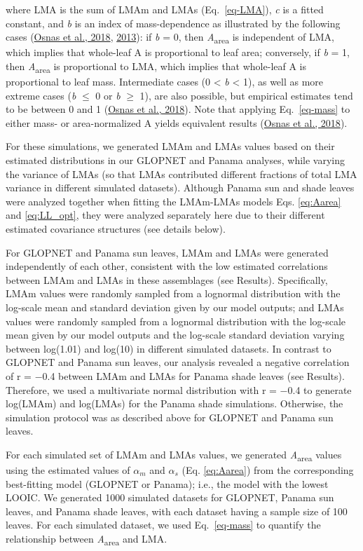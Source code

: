 \documentclass[
  12pt,
  a4paper,
,tablecaptionabove
]{scrartcl}
\begin{document}
where LMA is the sum of LMAm and LMAs (Eq.~\ref{eq-LMA}), \emph{c} is a
fitted constant, and \emph{b} is an index of mass-dependence as
illustrated by the following cases
(\protect\hyperlink{ref-Osnas2018}{Osnas et al., 2018},
\protect\hyperlink{ref-Osnas2013}{2013}): if \emph{b} = 0, then
\emph{A}\textsubscript{area} is independent of LMA, which implies that
whole-leaf A is proportional to leaf area; conversely, if \emph{b} = 1,
then \emph{A}\textsubscript{area} is proportional to LMA, which implies
that whole-leaf A is proportional to leaf mass. Intermediate cases (0
\textless{} \emph{b} \textless{} 1), as well as more extreme cases
(\emph{b} \(\le\) 0 or \emph{b} \(\geq\) 1), are also possible, but
empirical estimates tend to be between 0 and 1
(\protect\hyperlink{ref-Osnas2018}{Osnas et al., 2018}). Note that
applying Eq.~\ref{eq-mass} to either mass- or area-normalized A yields
equivalent results (\protect\hyperlink{ref-Osnas2018}{Osnas et al.,
2018}).

For these simulations, we generated LMAm and LMAs values based on their
estimated distributions in our GLOPNET and Panama analyses, while
varying the variance of LMAs (so that LMAs contributed different
fractions of total LMA variance in different simulated datasets).
Although Panama sun and shade leaves were analyzed together when fitting
the LMAm-LMAs models Eqs. \ref{eq:Aarea} and \ref{eq:LL_opt}, they were
analyzed separately here due to their different estimated covariance
structures (see details below).

For GLOPNET and Panama sun leaves, LMAm and LMAs were generated
independently of each other, consistent with the low estimated
correlations between LMAm and LMAs in these assemblages (see Results).
Specifically, LMAm values were randomly sampled from a lognormal
distribution with the log-scale mean and standard deviation given by our
model outputs; and LMAs values were randomly sampled from a lognormal
distribution with the log-scale mean given by our model outputs and the
log-scale standard deviation varying between log(1.01) and log(10) in
different simulated datasets. In contrast to GLOPNET and Panama sun
leaves, our analysis revealed a negative correlation of r = −0.4 between
LMAm and LMAs for Panama shade leaves (see Results). Therefore, we used
a multivariate normal distribution with r = −0.4 to generate log(LMAm)
and log(LMAs) for the Panama shade simulations. Otherwise, the
simulation protocol was as described above for GLOPNET and Panama sun
leaves.

For each simulated set of LMAm and LMAs values, we generated
\emph{A}\textsubscript{area} values using the estimated values of
\(\alpha_m\) and \(\alpha_s\) (Eq. \ref{eq:Aarea}) from the
corresponding best-fitting model (GLOPNET or Panama); i.e., the model
with the lowest LOOIC. We generated 1000 simulated datasets for GLOPNET,
Panama sun leaves, and Panama shade leaves, with each dataset having a
sample size of 100 leaves. For each simulated dataset, we used
Eq.~\ref{eq-mass} to quantify the relationship between
\emph{A}\textsubscript{area} and LMA.
\end{document}
